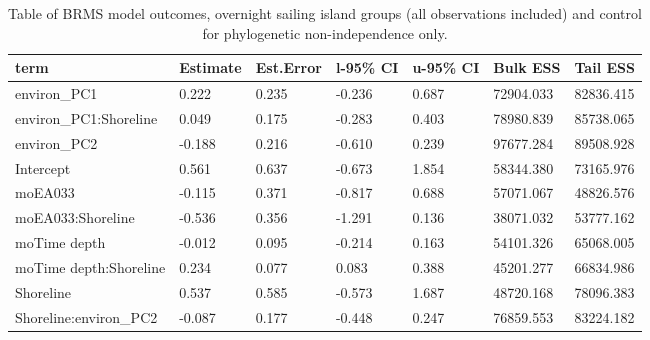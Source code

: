 \begin{table}[ht]
\centering
\begin{tabular}{p{4cm}p{1.65cm}p{1.65cm}p{1.65cm}p{1.65cm}p{1.65cm}p{1.65cm}}
  \toprule
term & Estimate & Est.Error & l-95\% CI & u-95\% CI & Bulk ESS & Tail ESS \\ 
  \midrule
environ\_PC1 & 0.222 & 0.235 & -0.236 & 0.687 & 72904.033 & 82836.415 \\ 
  environ\_PC1:Shoreline & 0.049 & 0.175 & -0.283 & 0.403 & 78980.839 & 85738.065 \\ 
  environ\_PC2 & -0.188 & 0.216 & -0.610 & 0.239 & 97677.284 & 89508.928 \\ 
  Intercept & 0.561 & 0.637 & -0.673 & 1.854 & 58344.380 & 73165.976 \\ 
  moEA033 & -0.115 & 0.371 & -0.817 & 0.688 & 57071.067 & 48826.576 \\ 
  moEA033:Shoreline & -0.536 & 0.356 & -1.291 & 0.136 & 38071.032 & 53777.162 \\ 
  moTime depth & -0.012 & 0.095 & -0.214 & 0.163 & 54101.326 & 65068.005 \\ 
  moTime depth:Shoreline & 0.234 & 0.077 & 0.083 & 0.388 & 45201.277 & 66834.986 \\ 
  Shoreline & 0.537 & 0.585 & -0.573 & 1.687 & 48720.168 & 78096.383 \\ 
  Shoreline:environ\_PC2 & -0.087 & 0.177 & -0.448 & 0.247 & 76859.553 & 83224.182 \\ 
   \bottomrule
\end{tabular}
\caption{Table of BRMS model outcomes, overnight sailing island groups (all observations included) and control for phylogenetic non-independence only.} 
\label{BRMS_effects_SBZR_control_none}
\end{table}
